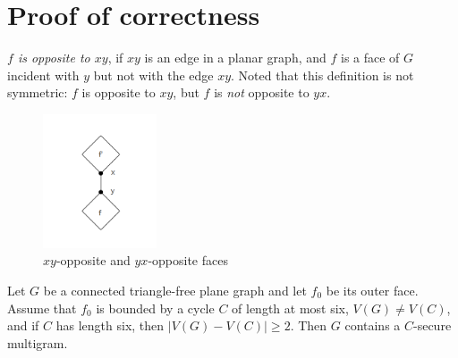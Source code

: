 \section{Proof of correctness}
\begin{definition}
\textit{$f$ is opposite to $xy$}, if $xy$ is an edge in a planar graph, and $f$ is a face of $G$ incident with $y$ but not with the edge $xy$. Noted that this definition is not symmetric: $f$ is opposite to $xy$, but $f$ is \textit{not} opposite to $yx$.
\begin{figure}[H] %
\centering %
\includegraphics[width=0.3\textwidth]{figure/opposite.png} 
\caption{$xy$-opposite and $yx$-opposite faces} %
\label{figure} %
\end{figure}
\end{definition}

\begin{lemma}
Let $G$ be a connected triangle-free plane graph and let $f_0$ be its
outer face. Assume that $f_0$ is bounded by a cycle $C$ of length at most six,
$V(G) \ne V (C)$, and if $C$ has length six, then $|V(G) - V(C)| \geq 2$. Then $G$
contains a $C$-secure multigram.

\end{lemma}

